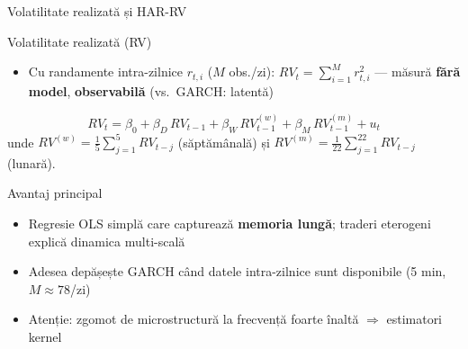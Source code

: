 \documentclass[9pt, aspectratio=169, t]{beamer}
\begin{document}
\begin{frame}{Volatilitate realizată și HAR-RV}
    \small
        \setlength{\abovedisplayskip}{1pt}\setlength{\belowdisplayskip}{1pt}
        \vspace{-0.4cm}
        \begin{block}{Volatilitate realizată (RV)}
            \begin{itemize}
                \item Cu randamente intra-zilnice $r_{t,i}$ ($M$ obs./zi): $RV_t = \sum_{i=1}^{M} r_{t,i}^2$ --- măsură \textbf{fără model}, \textbf{observabilă} (vs.\ GARCH: latentă)
            \end{itemize}
        \end{block}
        \vspace{-0.25cm}
        \begin{defn}
            \[
                RV_t = \beta_0 + \beta_D \, RV_{t-1} + \beta_W \, RV_{t-1}^{(w)} + \beta_M \, RV_{t-1}^{(m)} + u_t
            \]
            \vspace{-0.3cm}
            unde $RV^{(w)} = \frac{1}{5}\sum_{j=1}^{5} RV_{t-j}$ (săptămânală) și $RV^{(m)} = \frac{1}{22}\sum_{j=1}^{22} RV_{t-j}$ (lunară).
        \end{defn}
        \vspace{-0.25cm}
        \begin{alertblock}{Avantaj principal}
            \begin{itemize}
                \item Regresie OLS simplă care capturează \textbf{memoria lungă}; traderi eterogeni explică dinamica multi-scală
                \item Adesea depășește GARCH când datele intra-zilnice sunt disponibile (5 min, $M \approx 78$/zi)
                \item Atenție: zgomot de microstructură la frecvență foarte înaltă $\Rightarrow$ estimatori kernel
            \end{itemize}
        \end{alertblock}
\end{frame}
\end{document}
